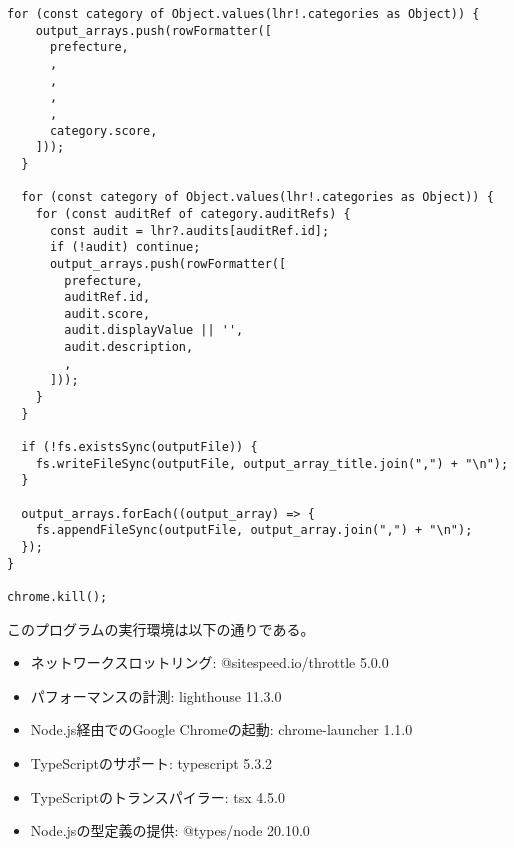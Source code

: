 \begin{lstlisting}[caption={Lighthouseを用いたパフォーマンスの計測},label={lst:Lighthouseを用いたパフォーマンスの計測}]
  for (const category of Object.values(lhr!.categories as Object)) {
    output_arrays.push(rowFormatter([
      prefecture,
      ,
      ,
      ,
      ,
      category.score,
    ]));
  }

  for (const category of Object.values(lhr!.categories as Object)) {
    for (const auditRef of category.auditRefs) {
      const audit = lhr?.audits[auditRef.id];
      if (!audit) continue;
      output_arrays.push(rowFormatter([
        prefecture,
        auditRef.id,
        audit.score,
        audit.displayValue || '',
        audit.description,
        ,
      ]));
    }
  }

  if (!fs.existsSync(outputFile)) {
    fs.writeFileSync(outputFile, output_array_title.join(",") + "\n");
  }

  output_arrays.forEach((output_array) => {
    fs.appendFileSync(outputFile, output_array.join(",") + "\n");
  });
}

chrome.kill();
\end{lstlisting}
このプログラムの実行環境は以下の通りである。
\begin{itemize}
    \item ネットワークスロットリング: @sitespeed.io/throttle 5.0.0
    \item パフォーマンスの計測: lighthouse 11.3.0
    \item Node.js経由でのGoogle Chromeの起動: chrome-launcher 1.1.0
    \item TypeScriptのサポート: typescript 5.3.2
    \item TypeScriptのトランスパイラー: tsx 4.5.0
    \item Node.jsの型定義の提供: @types/node 20.10.0
\end{itemize}